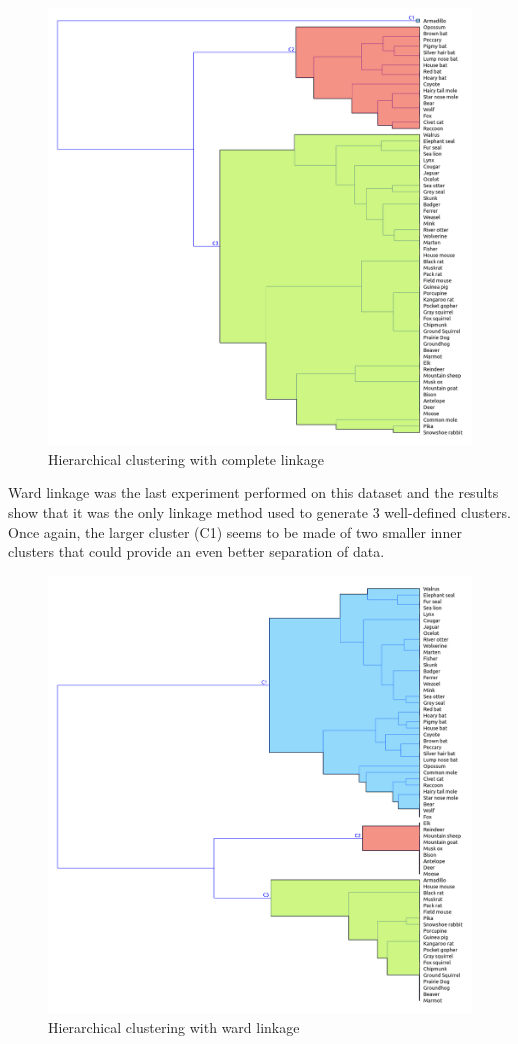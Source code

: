 \documentclass{article}
\begin{document}
\begin{figure}[htbp]
    \centering
    \includegraphics[scale=0.2]{complete.png}
    \caption{Hierarchical clustering with complete linkage}
    \label{fig:complete_linkage}
\end{figure}

Ward linkage was the last experiment performed on this dataset and the results show that it was the only linkage method used to generate 3 well-defined clusters. Once again, the larger cluster (C1) seems to be made of two smaller inner clusters that could provide an even better separation of data.

\begin{figure}[htbp]
    \centering
    \includegraphics[scale=0.2]{ward.png}
    \caption{Hierarchical clustering with ward linkage}
    \label{fig:ward_linkage}
\end{figure}
\end{document}
